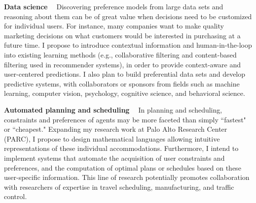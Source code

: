 \documentclass[11pt]{article}
\begin{document}
\smallskip \noindent \textbf{Data science \  } Discovering preference 
models from large data sets and reasoning about them 
can be of great value when decisions need to be customized for individual users.
For instance, many companies want to make quality marketing decisions
on what customers would be interested in purchasing at a future time.
I propose to introduce contextual information and human-in-the-loop into existing learning methods
(e.g., collaborative filtering and content-based filtering used in recommender systems), 
in order to provide context-aware and user-centered predictions.
I also plan to build preferential data sets and develop predictive systems, with collaborators
or sponsors from fields 
such as machine learning, computer vision, psychology, cognitive science, and behavioral science.

\smallskip \noindent \textbf{Automated planning and scheduling \  }
In planning and scheduling, constraints and preferences of agents may be more faceted than simply
``fastest" or ``cheapest."
Expanding my research work at Palo Alto Research Center (PARC),
I propose to design mathematical languages allowing
intuitive representations of these individual accommodations. 
Furthermore, I intend to implement systems
that automate the acquisition of user constraints and preferences, and the computation of optimal plans or schedules 
based on these user-specific information.
This line of research potentially promotes collaboration with researchers of expertise in
travel scheduling, manufacturing, and traffic control.


{}
\end{document}
